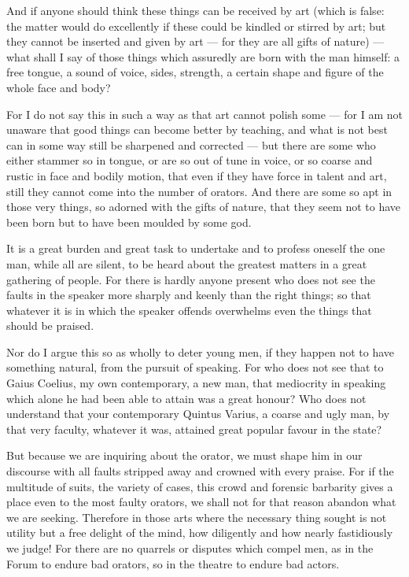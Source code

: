  And if anyone should think these things can be received by art (which is false: the matter would do excellently if these could be kindled or stirred by art; but they cannot be inserted and given by art — for they are all gifts of nature) — what shall I say of those things which assuredly are born with the man himself: a free tongue, a sound of voice, sides, strength, a certain shape and figure of the whole face and body?

 For I do not say this in such a way as that art cannot polish some — for I am not unaware that good things can become better by teaching, and what is not best can in some way still be sharpened and corrected — but there are some who either stammer so in tongue, or are so out of tune in voice, or so coarse and rustic in face and bodily motion, that even if they have force in talent and art, still they cannot come into the number of orators. And there are some so apt in those very things, so adorned with the gifts of nature, that they seem not to have been born but to have been moulded by some god.

 It is a great burden and great task to undertake and to profess oneself the one man, while all are silent, to be heard about the greatest matters in a great gathering of people. For there is hardly anyone present who does not see the faults in the speaker more sharply and keenly than the right things; so that whatever it is in which the speaker offends overwhelms even the things that should be praised.

 Nor do I argue this so as wholly to deter young men, if they happen not to have something natural, from the pursuit of speaking. For who does not see that to Gaius Coelius, my own contemporary, a new man, that mediocrity in speaking which alone he had been able to attain was a great honour? Who does not understand that your contemporary Quintus Varius, a coarse and ugly man, by that very faculty, whatever it was, attained great popular favour in the state?

 But because we are inquiring about the orator, we must shape him in our discourse with all faults stripped away and crowned with every praise. For if the multitude of suits, the variety of cases, this crowd and forensic barbarity gives a place even to the most faulty orators, we shall not for that reason abandon what we are seeking. Therefore in those arts where the necessary thing sought is not utility but a free delight of the mind, how diligently and how nearly fastidiously we judge! For there are no quarrels or disputes which compel men, as in the Forum to endure bad orators, so in the theatre to endure bad actors.


